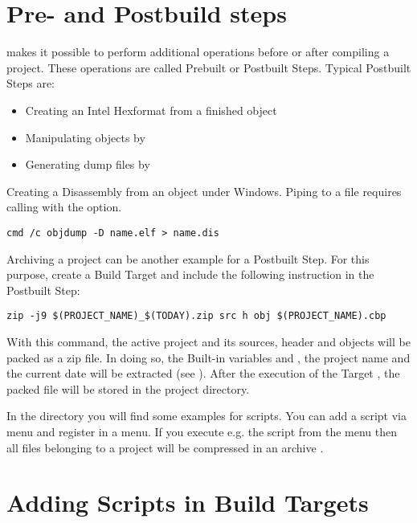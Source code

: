 \section{Pre- and Postbuild steps}\label{sec:pre_postbuild}

\codeblocks makes it possible to perform additional operations before or after compiling a project. These operations are called Prebuilt or Postbuilt Steps. Typical Postbuilt Steps are:

\begin{itemize}
\item Creating an Intel Hexformat from a finished object
\item Manipulating objects by 
\item Generating dump files by 
\end{itemize}


Creating a Disassembly from an object under Windows. Piping to a file requires calling  with the  option.

\begin{lstlisting}
cmd /c objdump -D name.elf > name.dis
\end{lstlisting}

Archiving a project can be another example for a Postbuilt Step. For this purpose, create a Build Target  and include the following instruction in the Postbuilt Step:

\begin{lstlisting}
zip -j9 $(PROJECT_NAME)_$(TODAY).zip src h obj $(PROJECT_NAME).cbp
\end{lstlisting}

With this command, the active project and its sources, header and objects will be packed as a zip file. In doing so, the Built-in variables  and , the project name and the current date will be extracted (see ). After the execution of the Target , the packed file will be stored in the project directory.

In the  directory you will find some examples for scripts. You can add a script via menu  and register in a menu. If you execute e.g. the script  from the menu then all files belonging to a project will be compressed in an archive .

\section{Adding Scripts in Build Targets}

